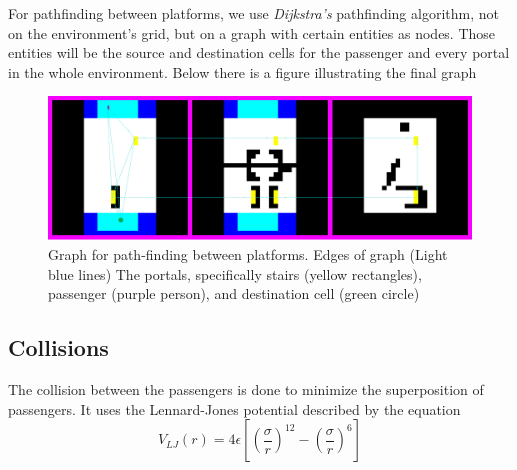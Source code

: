 For pathfinding between platforms, we use \textit{Dijkstra's} pathfinding algorithm, not on the environment's grid, but on a graph with certain entities as nodes. Those entities will be the source and destination cells for the passenger and every portal in the whole environment. Below there is a figure illustrating the final graph

\begin{figure}
    \centering
    \includegraphics[width=\columnwidth]{assets/meta_pathfinding.png}
    \caption{Graph for path-finding between platforms. Edges of graph (Light blue lines) The portals, specifically stairs (yellow rectangles), passenger (purple person), and destination cell (green circle)}
    \label{fig:meta_pathfinding}
\end{figure}


\subsection {Collisions}

The collision between the passengers is done to minimize the superposition of passengers. It uses the Lennard-Jones potential described by the equation 
$$
V_{LJ}(r)=4\epsilon\left[\left(\frac{\sigma}{r}\right)^{12}-\left(\frac{\sigma}{r}\right)^6\right]
$$
